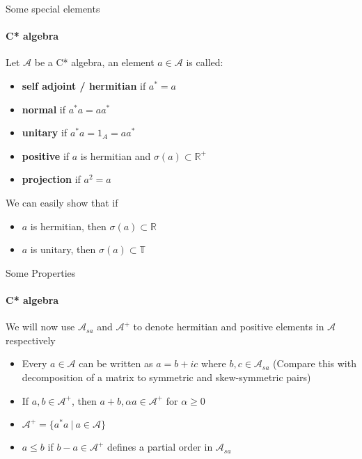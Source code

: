 \documentclass[dvipsnames]{beamer}
\newcommand{\1}{\mathds{1}}	%
\begin{document}
\begin{frame}{Some special elements}
\framesubtitle{C* algebra}
\begin{definition}
  Let $\mathcal{A}$ be a C* algebra, an element $a \in \mathcal{A}$ is called:
  \begin{itemize}
    \item \textbf{self adjoint / hermitian} if $a^* = a$ \pause
    \item {\bf normal} if $a^*a = aa^*$ \pause
    \item {\bf unitary} if $a^*a = 1_A = aa^*$ \pause
    \item {\bf positive} if $a$ is hermitian and $\sigma(a) \subset \mathbb{R}^+$ \pause
    \item {\bf projection} if $a^2 = a$
  \end{itemize}
\end{definition}

\pause
We can easily show that if
\begin{itemize}
  \item $a$ is hermitian, then $\sigma(a) \subset \mathbb{R}$ \pause
  \item $a$ is unitary, then $\sigma(a) \subset \mathbb{T}$ 
\end{itemize}
\end{frame}

\begin{frame}{Some Properties}
\framesubtitle{C* algebra}
  We will now use $\mathcal{A}_{sa}$ and $\mathcal{A}^+$ to denote hermitian and positive elements in $\mathcal{A}$ respectively \pause 
  \begin{itemize}
    \item Every $a \in \mathcal{A}$ can be written as $a = b + ic$ where $b, c \in \mathcal{A}_{sa}$ \pause (Compare this with decomposition of a matrix to symmetric and skew-symmetric pairs) \pause
    \item If $a, b \in \mathcal{A}^+$, then $a+b, \alpha a \in \mathcal{A}^+$ for $\alpha \ge 0$ \pause
    \item $\mathcal{A}^+ = \{a^*a \ | \ a \in \mathcal{A}\}$ \pause
    \item $a \le b$ if $b - a \in \mathcal{A}^+$ defines a partial order in $\mathcal{A}_{sa}$
  \end{itemize}
\end{frame}
\end{document}
